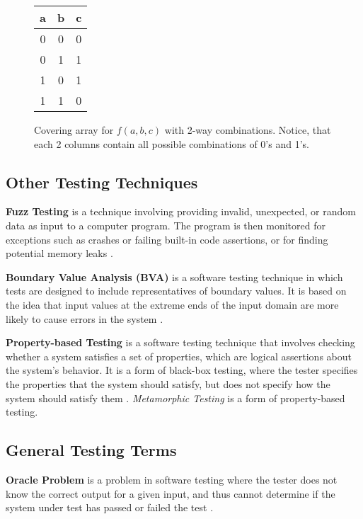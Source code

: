 \begin{figure}
\centering
\begin{tabular}{|c|c|c|}
    \hline
    a & b & c \\
    \hline
    0 & 0 & 0 \\
    0 & 1 & 1 \\
    1 & 0 & 1 \\
    1 & 1 & 0 \\
    \hline
\end{tabular}
\caption{Covering array for $f(a, b, c)$ with 2-way combinations. Notice, that each 2 columns contain all possible combinations of 0's and 1's.}
\label{fig:CovArray}
\end{figure}

\subsection{Other Testing Techniques}

\textbf{Fuzz Testing} is a technique involving providing invalid, unexpected, or random data as input to a computer program. The program is then monitored for exceptions such as crashes or failing built-in code assertions, or for finding potential memory leaks \cite{Fuzz}.

\textbf{Boundary Value Analysis (BVA)} is a software testing technique in which tests are designed to include representatives of boundary values. It is based on the idea that input values at the extreme ends of the input domain are more likely to cause errors in the system \cite{BVA}.

\textbf{Property-based Testing} is a software testing technique that involves checking whether a system satisfies a set of properties, which are logical assertions about the system's behavior. It is a form of black-box testing, where the tester specifies the properties that the system should satisfy, but does not specify how the system should satisfy them \cite{Hypothesis}. \textit{Metamorphic Testing} is a form of property-based testing.

\subsection{General Testing Terms}

\textbf{Oracle Problem} is a problem in software testing where the tester does not know the correct output for a given input, and thus cannot determine if the system under test has passed or failed the test \cite{FELDERER20161}.

